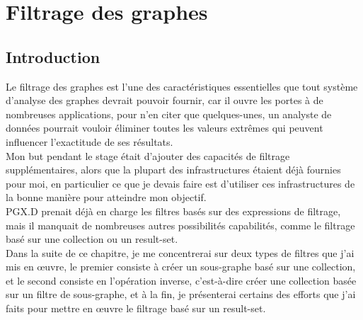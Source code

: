 \chapter{Filtrage des graphes}
\section{Introduction}
Le filtrage des graphes est l'une des caractéristiques essentielles que tout système d'analyse des graphes devrait pouvoir fournir, car il ouvre les portes à de nombreuses applications, pour n'en citer que quelques-unes, un analyste de données pourrait vouloir éliminer toutes les valeurs extrêmes qui peuvent influencer l'exactitude de ses résultats.\\
Mon but pendant le stage était d'ajouter des capacités de filtrage supplémentaires, alors que la plupart des infrastructures étaient déjà fournies pour moi, en particulier ce que je devais faire est d'utiliser ces infrastructures de la bonne manière pour atteindre mon objectif.\\
PGX.D prenait déjà en charge les filtres basés sur des expressions de filtrage, mais il manquait de nombreuses autres possibilités capabilités, comme le filtrage basé sur une collection ou un result-set.\\
Dans la suite de ce chapitre, je me concentrerai sur deux types de filtres que j'ai mis en œuvre, le premier consiste à créer un sous-graphe basé sur une collection, et le second consiste en l'opération inverse, c'est-à-dire créer une collection basée sur un filtre de sous-graphe, et à la fin, je présenterai certains des efforts que j'ai faits pour mettre en œuvre le filtrage basé sur un result-set.\\

